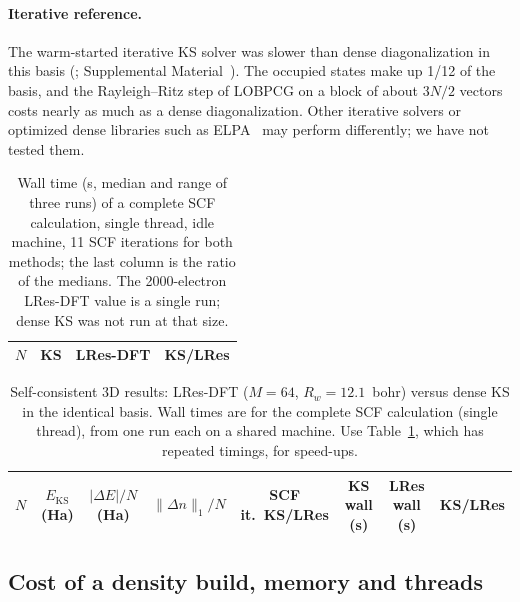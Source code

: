 \documentclass[aps,prb,twocolumn,superscriptaddress,floatfix,longbibliography]{revtex4-2}
\theoremstyle{remark}
\newcommand{\SM}{Supplemental Material~\cite{SM}}
\begin{document}
\paragraph*{Iterative reference.} The warm-started iterative KS solver was slower than dense diagonalization in this basis
(; \SM). The occupied states make up 1/12 of the basis, and the Rayleigh--Ritz step of LOBPCG on a
block of about $3N/2$ vectors costs nearly as much as a dense diagonalization. Other iterative solvers or optimized dense
libraries such as ELPA~\cite{ELPA2014} may perform differently; we have not tested them.

\begin{table}[t]
\caption{\label{tab:rigorous}Wall time (s, median and range of three runs) of a complete SCF calculation, single thread,
idle machine, 11 SCF iterations for both methods; the last column is the ratio of the medians. The 2000-electron LRes-DFT
value is a single run; dense KS was not run at that size.}
\begin{ruledtabular}
\footnotesize
\begin{tabular}{rccc}
$N$ & KS & LRes-DFT & KS/LRes \\
\hline

\end{tabular}
\end{ruledtabular}
\end{table}

\begin{table}[t]
\caption{\label{tab:scf3d}Self-consistent 3D results: LRes-DFT ($M=64$, $R_w=12.1$~bohr) versus dense KS in the identical
basis. Wall times are for the complete SCF calculation (single thread), from one run each on a shared machine. Use
Table~\ref{tab:rigorous}, which has repeated timings, for speed-ups.}
\begin{ruledtabular}
\footnotesize
\begin{tabular}{cccccccc}
$N$ & $E_\mathrm{KS}$ (Ha) & $|\Delta E|/N$ (Ha) & $\|\Delta n\|_1/N$ & SCF it.\ KS/LRes & KS wall (s) & LRes wall (s) & KS/LRes \\
\hline

\end{tabular}
\end{ruledtabular}
\end{table}

\subsection{Cost of a density build, memory and threads}
\end{document}
